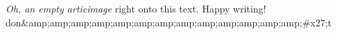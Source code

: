 \textit{Oh, an empty articimage} right onto this text. Happy writing! 
don&amp;amp;amp;amp;amp;amp;amp;amp;amp;amp;amp;amp;amp;#x27;t